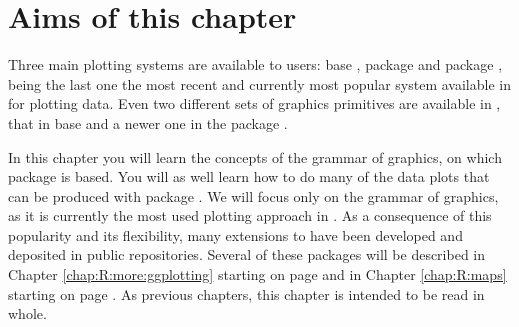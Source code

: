 \documentclass[krantz2]{krantz}\usepackage{knitr}%
\begin{document}


\section{Aims of this chapter}

Three main plotting systems are available to \Rlang users: base \Rlang, package  \autocite{Sarkar2008} and package  \autocite{Wickham2016}, being the last one the most recent and currently most popular system available in \Rlang for plotting data. Even two different sets of graphics primitives are available in \Rlang, that in base \Rlang and a newer one in the  package \autocite{Murrell2011}.

In this chapter you will learn the concepts of the grammar of graphics, on which package  is based. You will as well learn how to do many of the data plots that can be produced with package . We will focus only on the grammar of graphics, as it is currently the most used plotting approach in \Rlang. As a consequence of this popularity and its flexibility, many extensions to  have been developed and deposited in public repositories. Several of these packages will be described in Chapter \ref{chap:R:more:ggplotting} starting on page \pageref{chap:R:more:ggplotting} and in Chapter \ref{chap:R:maps} starting on page \pageref{chap:R:maps}. As previous chapters, this chapter is intended to be read in whole.
\end{document}
